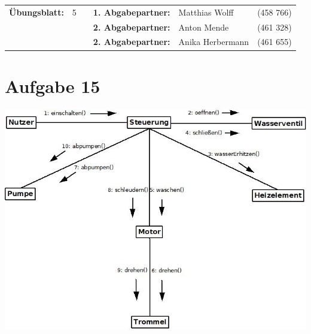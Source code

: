 \newcommand{\obenlinks}{Software Engineering}		%

\usepackage{float}


	\begin{center}
		\begin{tabular}{|rlp{4cm}rll|}
		\hline
		 \textbf{Übungsblatt:} & 5 &   & \textbf{1. Abgabepartner:} & Matthias Wolff & (458 766)  \\
		        & & & \textbf{2. Abgabepartner:} & Anton Mende & (461 328) \\
		        & & & \textbf{2. Abgabepartner:} & Anika Herbermann & (461 655) \\ \hline
		\end{tabular}
	\end{center}
\section*{Aufgabe 15}
\includegraphics[width=\textwidth,height=\textheight,keepaspectratio]{Aufgabe_15.jpeg}
